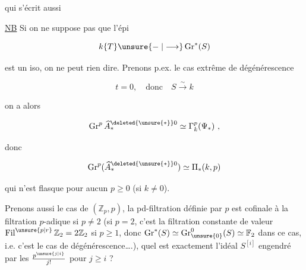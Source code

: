 
qui s'écrit aussi


\uline{NB} Si on ne suppose pas que l'épi

\[
 k\{T\}\unsure{\relbar|\longrightarrow}\operatorname{Gr}^*(S)
\]

est un iso, on ne peut rien dire. Prenons p.ex. le cas extrême de dégénérescence

\[
 t=0,\quad\text{donc}\quad S\xrightarrow{\sim}k
\]

on a alors

\[
 \operatorname{Gr}^p\widehat A_*^{\deleted{\unsure{*}}0}\simeq\Gamma_k^p(\Psi_*)\ ,
\]

donc

\[
 \operatorname{Gr}^p(\widehat A_*^{\deleted{\unsure{*}}0})\simeq\Pi_*(k,p)
\]

qui n'est flasque pour aucun $p\geq0$ (si $k\ne0$).

Prenons aussi le cas de $(\mathbb Z_p,p)$, la pd-filtration définie par $p$ est cofinale à la filtration $p$-adique si $p\ne2$ (si $p=2$, c'est la filtration constante de valeur $\operatorname{Fil}^{\unsure{p|r}}\mathbb Z_2=2\mathbb Z_2$ si $p\geq1$, donc $\operatorname{Gr}^*(S)\simeq\operatorname{Gr}^{0}_{\unsure{0}}(S)\simeq\mathbb F_2$ dans ce cas, i.e. c'est  le cas de dégénérescence\ldots.), quel est exactement l'idéal  $S^{[i]}$ engendré par les $\frac{p^{\unsure{j|i}}}{j!}$ pour $j\geq i$ ? 

